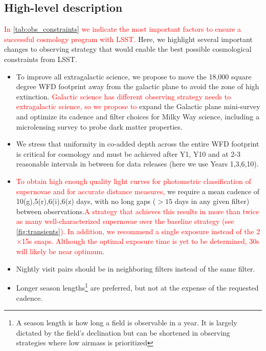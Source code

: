 \documentclass[12pt, letterpaper]{article}
\newcommand{\review}[1]{{\textcolor{red}{#1}}}
\begin{document}
\subsection{High-level description}
\review{In \autoref{tab:obs_constraints} we indicate the most important factors to ensure a successful cosmology program with LSST.} Here, we highlight several important changes to observing strategy that would enable the best possible cosmological constraints from LSST. 
\begin{itemize}
    \item To improve all extragalactic science, we propose to move the 18,000 square degree WFD footprint away from the galactic plane to avoid the zone of high extinction.  \review{Galactic science has different observing strategy needs to extragalactic science, so we propose to} expand the Galactic plane mini-survey and optimize its cadence and filter choices for Milky Way science, including a microlensing survey to probe dark matter properties.    
\item We stress that uniformity in co-added depth across the entire WFD footprint is critical for cosmology and must be achieved after Y1, Y10 and at 2-3 reasonable intervals in between for data releases (here we use Years 1,3,6,10). 
\item \review{To obtain high enough quality light curves for photometric classification of supernovae and for accurate distance measures,} we require a mean cadence of 10(g),5(r),6(i),6(z) days, with no long gaps ($>15$ days in any given filter) between observations.\review{A strategy that achieves this results in more than twice as many well-characterized supernovae over the baseline strategy (see \autoref{fig:transients}).} \review{In addition, we recommend a single exposure instead of the 2$\times$15s snaps. Although the optimal exposure time is yet to be determined, 30s will likely be near optimum}.
\item Nightly visit pairs should be in neighboring filters instead of the same filter. 
\item Longer season lengths\review{\footnote{A season length is how long a field is observable in a year. It is largely dictated by the field's declination but can be shortened in observing strategies where low airmass is prioritized}} are preferred, but not at the expense of the requested cadence. 

\end{itemize}
\end{document}
